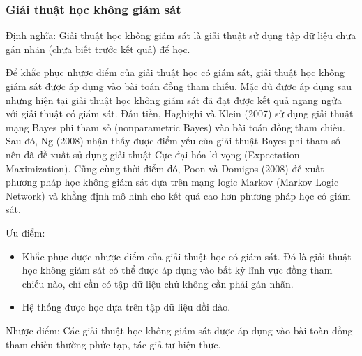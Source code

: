 \documentclass[12pt]{extarticle}
\begin{document}
				\subsubsection*{Giải thuật học không giám sát}
					\par Định nghĩa: Giải thuật học không giám sát là giải thuật sử dụng tập dữ liệu chưa gán nhãn (chưa biết trước kết quả) để học.
					\par Để khắc phục nhược điểm của giải thuật học có giám sát, giải thuật học không giám sát được áp dụng vào bài toán đồng tham chiếu. Mặc dù được áp dụng sau nhưng hiện tại giải thuật học không giám sát đã đạt được kết quả ngang ngửa với giải thuật có giám sát. Đầu tiền, Haghighi và Klein (2007)\cite{haghighi09} sử dụng giải thuật mạng Bayes phi tham số (nonparametric Bayes) vào bài toán đồng tham chiếu. Sau đó, Ng (2008)\cite{ng08} nhận thấy được điểm yếu của giải thuật Bayes phi tham số nên đã đề xuất sử dụng giải thuật Cực đại hóa kì vọng (Expectation Maximization). Cũng cùng thời điểm đó, Poon và Domigos (2008)\cite{poon08} đề xuất phương pháp học không giám sát dựa trên mạng logic Markov (Markov Logic Network) và khẳng định mô hình cho kết quả cao hơn phương pháp học có giám sát.
					\par Ưu điểm:
					\begin{itemize}
						\item{Khắc phục được nhược điểm của giải thuật học có giám sát. Đó là giải thuật học không giám sát có thể được áp dụng vào bất kỳ lĩnh vực đồng tham chiếu nào, chỉ cần có tập dữ liệu chứ không cần phải gán nhãn.}
						\item{Hệ thống được học dựa trên tập dữ liệu dồi dào.}
					\end{itemize}
					\par Nhược điểm: Các giải thuật học không giám sát được áp dụng vào bài toàn đồng tham chiếu thường phức tạp, tác giả tự hiện thực.
\end{document}
